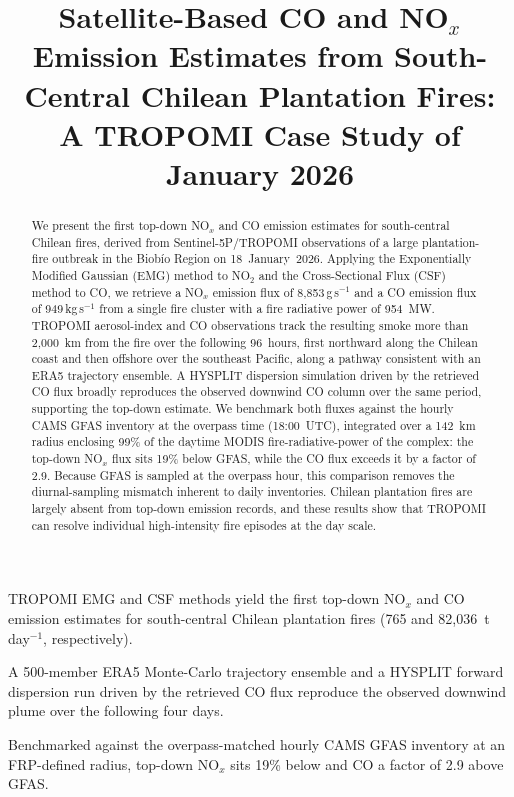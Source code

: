 \documentclass[draft]{agujournal2019}
\newcommand{\NOx}{NO$_x$}
\newcommand{\NOtwo}{NO$_2$}
\newcommand{\kgs}{\,kg\,s$^{-1}$}
\newcommand{\gs}{\,g\,s$^{-1}$}
\begin{document}
\title{Satellite-Based CO and \NOx{} Emission Estimates from South-Central Chilean Plantation Fires: A TROPOMI Case Study of January 2026}


\begin{keypoints}
  \item TROPOMI EMG and CSF methods yield the first top-down \NOx{} and CO
        emission estimates for south-central Chilean plantation fires
        (765 and 82{,}036~t\,day$^{-1}$, respectively).
  \item A 500-member ERA5 Monte-Carlo trajectory ensemble and a HYSPLIT
        forward dispersion run driven by the retrieved CO flux reproduce the
        observed downwind plume over the following four days.
  \item Benchmarked against the overpass-matched hourly CAMS GFAS inventory
        at an FRP-defined radius, top-down \NOx{} sits 19\% below and CO a
        factor of 2.9 above GFAS.
\end{keypoints}

\begin{abstract}
We present the first top-down \NOx{} and CO emission estimates for south-central Chilean fires, derived from Sentinel-5P/TROPOMI observations of a large plantation-fire outbreak in the Biob\'io Region on 18~January~2026. Applying the Exponentially Modified Gaussian (EMG) method to \NOtwo{} and the Cross-Sectional Flux (CSF) method to CO, we retrieve a \NOx{} emission flux of 8{,}853\gs{} and a CO emission flux of 949\kgs{} from a single fire cluster with a fire radiative power of 954~MW. TROPOMI aerosol-index and CO observations track the resulting smoke more than 2{,}000~km from the fire over the following 96~hours, first northward along the Chilean coast and then offshore over the southeast Pacific, along a pathway consistent with an ERA5 trajectory ensemble. A HYSPLIT dispersion simulation driven by the retrieved CO flux broadly reproduces the observed downwind CO column over the same period, supporting the top-down estimate. We benchmark both fluxes against the hourly CAMS GFAS inventory at the overpass time (18:00~UTC), integrated over a 142~km radius enclosing 99\% of the daytime MODIS fire-radiative-power of the complex: the top-down \NOx{} flux sits 19\% below GFAS, while the CO flux exceeds it by a factor of 2.9. Because GFAS is sampled at the overpass hour, this comparison removes the diurnal-sampling mismatch inherent to daily inventories. Chilean plantation fires are largely absent from top-down emission records, and these results show that TROPOMI can resolve individual high-intensity fire episodes at the day scale.
\end{abstract}
\end{document}
